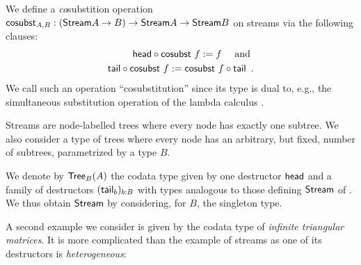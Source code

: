 \documentclass{amsart}
\begin{document}
\begin{example}
   
   We define a \emph{co}substition operation $\mathsf{cosubst}_{A,B} : (\mathsf{Stream} A \to B) \to \mathsf{Stream} A\to\mathsf{Stream} B$ on streams via the following clauses:
   \begin{align} {\ensuremath{\mathsf{head}}} \circ {\ensuremath{\mathsf{cosubst}}~f} := f \quad\text{ and } \notag\\
                  {\mathsf{tail}} \circ {\ensuremath{\mathsf{cosubst}}~f} := {\mathsf{cosubst}~f} \circ {\ensuremath{\mathsf{tail}}} \enspace . \label{eq:tail_sredec}
    \end{align}
  We call such an operation \enquote{cosubstitution} since its type is dual to, e.g., the simultaneous substitution operation 
  of the lambda calculus \parencite{alt_reus}.
\end{example}





Streams are node-labelled trees where every node has exactly one subtree.
We also consider a type of trees where every node has an arbitrary, but fixed, number of subtrees, 
parametrized by a type $B$.

\begin{example}\label{ex_trees}
 We denote by $\mathsf{Tree}_B(A)$ the codata type given by one destructor $\mathsf{head}$ and a family of 
 destructors $(\mathsf{tail}_b)_{b:B}$ with types analogous to those defining $\mathsf{Stream}$ of .
 We thus obtain $\mathsf{Stream}$ by considering, for $B$, the singleton type.
\end{example}



A second example we consider is given by the codata type of
\emph{infinite triangular matrices}. It is more complicated than the example of streams as one of its destructors is \emph{heterogeneous}:
\end{document}

